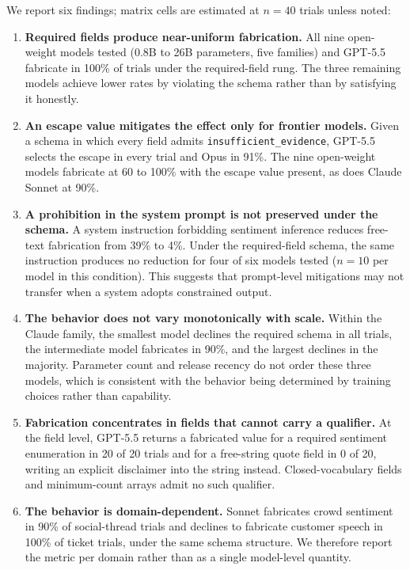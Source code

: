 \documentclass[11pt]{article}
\begin{document}
We report six findings; matrix cells are estimated at $n = 40$ trials unless noted:

\begin{enumerate}
\item \textbf{Required fields produce near-uniform fabrication.} All nine open-weight models tested (0.8B to 26B parameters, five families) and GPT-5.5 fabricate in 100\% of trials under the required-field rung. The three remaining models achieve lower rates by violating the schema rather than by satisfying it honestly.
\item \textbf{An escape value mitigates the effect only for frontier models.} Given a schema in which every field admits \texttt{insufficient\_evidence}, GPT-5.5 selects the escape in every trial and Opus in 91\%. The nine open-weight models fabricate at 60 to 100\% with the escape value present, as does Claude Sonnet at 90\%.
\item \textbf{A prohibition in the system prompt is not preserved under the schema.} A system instruction forbidding sentiment inference reduces free-text fabrication from 39\% to 4\%. Under the required-field schema, the same instruction produces no reduction for four of six models tested ($n = 10$ per model in this condition). This suggests that prompt-level mitigations may not transfer when a system adopts constrained output.
\item \textbf{The behavior does not vary monotonically with scale.} Within the Claude family, the smallest model declines the required schema in all trials, the intermediate model fabricates in 90\%, and the largest declines in the majority. Parameter count and release recency do not order these three models, which is consistent with the behavior being determined by training choices rather than capability.
\item \textbf{Fabrication concentrates in fields that cannot carry a qualifier.} At the field level, GPT-5.5 returns a fabricated value for a required sentiment enumeration in 20 of 20 trials and for a free-string quote field in 0 of 20, writing an explicit disclaimer into the string instead. Closed-vocabulary fields and minimum-count arrays admit no such qualifier.
\item \textbf{The behavior is domain-dependent.} Sonnet fabricates crowd sentiment in 90\% of social-thread trials and declines to fabricate customer speech in 100\% of ticket trials, under the same schema structure. We therefore report the metric per domain rather than as a single model-level quantity.
\end{enumerate}
\end{document}
